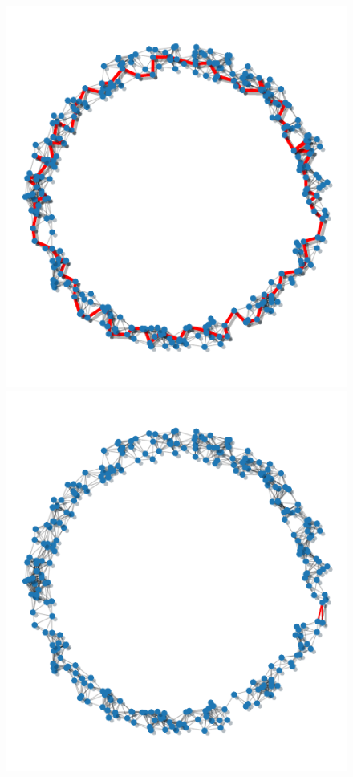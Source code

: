 \begin{figure}[htbp]
\centering
    \includegraphics[scale=1.]{figures/homology_cycle.pdf}
    \includegraphics[scale=1.]{figures/cohomology_cocycle.pdf}
    \caption{}
    \label{fig:cycles}
\end{figure}

